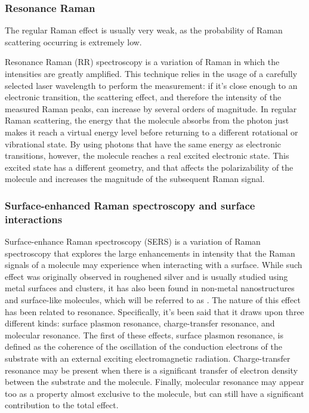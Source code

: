 \subsubsection{Resonance Raman}
The regular Raman effect is usually very weak, as the probability of Raman scattering occurring is extremely low.

Resonance Raman (RR) spectroscopy is a variation of Raman in which the intensities are greatly amplified.
This technique relies in the usage of a carefully selected laser wavelength to perform the measurement: if it's close enough to an electronic transition, the scattering effect, and therefore the intensity of the measured Raman peaks, can increase by several orders of magnitude.
In regular Raman scattering, the energy that the molecule absorbs from the photon just makes it reach a virtual energy level before returning to a different rotational or vibrational state.
By using photons that have the same energy as electronic transitions, however, the molecule reaches a real excited electronic state.
This excited state has a different geometry, and that affects the polarizability of the molecule and increases the magnitude of the subsequent Raman signal.


\subsubsection{Surface-enhanced Raman spectroscopy and surface interactions}
Surface-enhance Raman spectroscopy (SERS) is a variation of Raman spectroscopy that explores the large enhancements in intensity that the Raman signals of a molecule may experience when interacting with a surface.
While such effect was originally observed in roughened silver and is usually studied using metal surfaces and clusters, it has also been found in non-metal nanostructures and surface-like molecules, which will be referred to as .
The nature of this effect has been related to resonance.
Specifically, it's been said that it draws upon three different kinds: surface plasmon resonance, charge-transfer resonance, and molecular resonance.
The first of these effects, surface plasmon resonance, is defined as the coherence of the oscillation of the conduction electrons of the substrate with an external exciting electromagnetic radiation.
Charge-transfer resonance may be present when there is a significant transfer of electron density between the substrate and the molecule.
Finally, molecular resonance may appear too as a property almost exclusive to the molecule, but can still have a significant contribution to the total effect.

